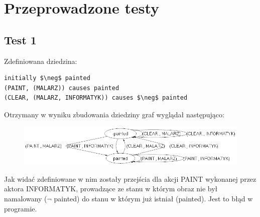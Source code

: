 \documentclass{article}
\begin{document}
\section{Przeprowadzone testy}
\subsection{Test 1}
Zdefiniowana dziedzina:
\bigskip
{}
\begin{lstlisting}[mathescape=true]
initially $\neg$ painted
(PAINT, (MALARZ)) causes painted
(CLEAR, (MALARZ, INFORMATYK)) causes $\neg$ painted
\end{lstlisting}
\vspace{1cm}
Otrzymany w wyniku zbudowania dziedziny graf wyglądał następująco:

\begin{figure}[H]
\centering
\includegraphics[scale=0.6]{test1_graf}
\end{figure}

Jak widać zdefiniowane w nim zostały przejścia dla akcji PAINT wykonanej przez aktora INFORMATYK, prowadzące ze stanu w którym obraz nie był namalowany ($\neg$ painted) do stanu w którym już istniał (painted). Jest to błąd w programie.

\newpage
\end{document}
